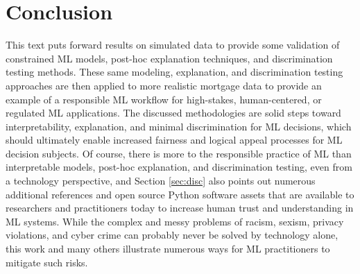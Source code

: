 \documentclass[information,article,accept,moreauthors,pdftex]{Definitions/mdpi}
\begin{document}
\section{Conclusion}\label{sec:con}

This text puts forward results on simulated data to provide some validation of constrained ML models, post-hoc explanation techniques, and discrimination testing methods. These same modeling, explanation, and discrimination testing approaches are then applied to more realistic mortgage data to provide an example of a responsible ML workflow for high-stakes, human-centered, or regulated ML applications. The discussed methodologies are solid steps toward interpretability, explanation, and minimal discrimination for ML decisions, which should ultimately enable increased fairness and logical appeal processes for ML decision subjects. Of course, there is more to the responsible practice of ML than interpretable models, post-hoc explanation, and discrimination testing, even from a technology perspective, and Section \ref{sec:disc} also points out numerous additional references and open source Python software assets that are available to researchers and practitioners today to increase human trust and understanding in ML systems. While the complex and messy problems of racism, sexism, privacy violations, and cyber crime can probably never be solved by technology alone, this work and many others illustrate numerous ways for ML practitioners to mitigate such risks. 

\vspace{+6pt}
\end{document}
